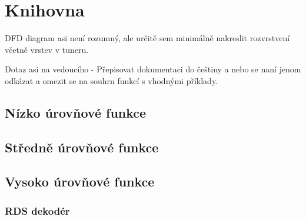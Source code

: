 \section{Knihovna}
\label{sec:knihovna}
DFD diagram asi není rozumný, ale určitě sem minimálně nakreslit rozvrstvení včetně vrstev v tuneru.

Dotaz asi na vedoucího - Přepisovat dokumentaci do češtiny a nebo se naní jenom odkázat a omezit se na souhrn funkcí s vhodnými příklady.


\subsection{Nízko úrovňové funkce}

\subsection{Středně úrovňové funkce}

\subsection{Vysoko úrovňové funkce}
\subsubsection{RDS dekodér}
